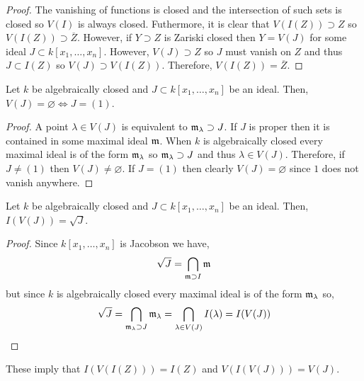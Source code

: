 \documentclass[12pt]{article}
\begin{document}
\begin{proof}
The vanishing of functions is closed and the intersection of such sets is closed so $V(I)$ is always closed. Futhermore, it is clear that $V(I(Z)) \supset Z$ so $V(I(Z)) \supset \overline{Z}$. However, if $Y \supset Z$ is Zariski closed then $Y = V(J)$ for some ideal $J \subset k[x_1, \dots, x_n]$. However, $V(J) \supset Z$ so $J$ must vanish on $Z$ and thus $J \subset I(Z)$ so $V(J) \supset V(I(Z))$. Therefore, $V(I(Z)) = \overline{Z}$. 
\end{proof}

\begin{thm}
Let $k$ be algebraically closed and $J \subset k[x_1,\dots, x_n]$ be an ideal. Then, $V(J) = \varnothing \iff J = (1)$. 
\end{thm}

\begin{proof}
A point $\lambda \in V(J)$ is equivalent to $\mathfrak{m}_\lambda \supset J$. If $J$ is proper then it is contained in some maximal ideal $\mathfrak{m}$. When $k$ is algebraically closed every maximal ideal is of the form $\mathfrak{m}_\lambda$ so $\mathfrak{m}_\lambda \supset J$ and thus $\lambda \in V(J)$. Therefore, if $J \neq (1)$ then $V(J) \neq \varnothing$. If $J = (1)$ then clearly $V(J) = \varnothing$ since $1$ does not vanish anywhere.
\end{proof}

\begin{thm}
Let $k$ be algebraically closed and $J \subset k[x_1,\dots, x_n]$ be an ideal. Then, $I(V(J)) = \sqrt{J}$. 
\end{thm}

\begin{proof}
Since $k[x_1, \dots, x_n]$ is Jacobson we have,
\[ \sqrt{J} = \bigcap_{\mathfrak{m} \supset I} \mathfrak{m} \]
but since $k$ is algebraically closed every maximal ideal is of the form $\mathfrak{m}_\lambda$ so,
\[ \sqrt{J} = \bigcap_{\mathfrak{m}_\lambda \supset J} \mathfrak{m}_\lambda = \bigcap_{\lambda \in V(J)} I(\lambda) = I(V(J)) \]
\end{proof}

\begin{remark}
These imply that $I(V(I(Z))) = I(Z)$ and $V(I(V(J))) = V(J)$.
\end{remark}
\end{document}
